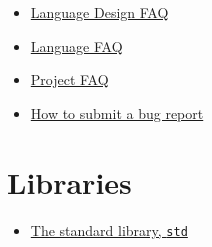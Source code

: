 \documentclass[]{article}
\begin{document}
\begin{itemize}
\itemsep1pt\parskip0pt
\item
  \href{complement-design-faq.html}{Language Design FAQ}
\item
  \href{complement-lang-faq.html}{Language FAQ}
\item
  \href{complement-project-faq.html}{Project FAQ}
\item
  \href{complement-bugreport.html}{How to submit a bug report}
\end{itemize}

\section{Libraries}\label{libraries}

\begin{itemize}
\itemsep1pt\parskip0pt
\item
  \href{std/index.html}{The standard library, \texttt{std}}
\end{itemize}
\end{document}
